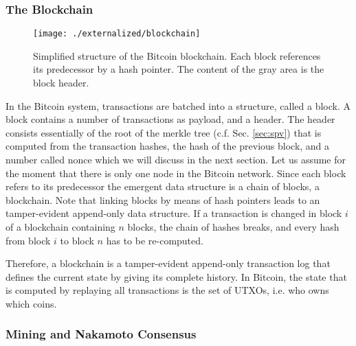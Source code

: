 \subsubsection{The Blockchain}
\label{sec:blockchain}

 \begin{figure*}[!t]
    \centering
    \texttt{[image: ./externalized/blockchain]}
    \caption{Simplified structure of the Bitcoin blockchain. Each block references its predecessor by a hash pointer. The content of the gray area is the block header.}
    \label{fig:blockchain}
  \end{figure*}

In the Bitcoin system, transactions are batched into a structure, called a block. A block contains a number of  transactions as payload, and a header. The header consists essentially of the root of the merkle tree (c.f. Sec. \ref{sec:spv}) that is computed from the transaction hashes, the hash of the previous block, and a number called nonce which we will discuss in the next section. Let us assume for the moment that there is only one node in the Bitcoin network. Since each block refers to its predecessor the emergent data structure is a chain of blocks, a blockchain. Note that linking blocks by means of hash pointers leads to an tamper-evident append-only data structure. If a transaction is changed in block $i$ of a blockchain containing $n$ blocks, the chain of hashes breaks, and every hash from block $i$ to block $n$ has to be re-computed.

Therefore, a blockchain is a tamper-evident append-only transaction log that defines the current state by giving its complete history. In Bitcoin, the state that is computed by replaying all transactions is the set of \ac{UTXO}s, i.e. who owns which coins.

\subsubsection{Mining and Nakamoto Consensus}
\label{sec:mining}

